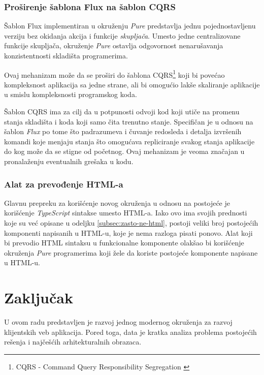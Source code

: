 \documentclass[12pt,oneside]{memoir}
\begin{document}
\subsection{Proširenje šablona Flux na šablon CQRS}
Šablon Flux implementiran u okruženju \emph{Pure} predstavlja jednu
pojednostavljenu verziju bez okidanja akcija i funkcije
\emph{skupljača}. Umesto jedne centralizovane funkcije skupljača,
okruženje \emph{Pure} ostavlja odgovornost nenarušavanja
konzistentnosti skladišta programerima.

Ovaj mehanizam može da se proširi do šablona CQRS\footnote{CQRS - Command Query Responsibility Segregation \cite{CQRS}} \cite{CQRS} koji bi povećao
kompleksnost aplikacija sa jedne strane, ali bi omogućio lakše
skaliranje aplikacije u smislu kompleksnosti programskog koda.

Šablon CQRS ima za cilj da u potpunosti odvoji kod koji utiče na
promenu stanja skladišta i koda koji samo čita trenutno stanje.
Specifičan je u odnosu na šablon \emph{Flux} po tome što padrazumeva i čuvanje redosleda i detalja izvršenih komandi koje menjaju stanja što omogućava repliciranje svakog stanja aplikacije
do kog može da se stigne od početnog. Ovaj mehanizam je veoma značajan u pronalaženju eventualnih grešaka u kodu.
\subsection{Alat za prevođenje HTML-a}
Glavnu prepreku za korišćenje novog okruženja u odnosu na postojeće je korišćenje \emph{TypeScript} sintakse umesto HTML-a. Iako ovo ima svojih prednosti koje su već opisane u odeljku \ref{subsec:zasto-ne-html}, postoji veliki broj postojećih komponenti
napisanih u HTML-u, koje je nema razloga pisati ponovo.
Alat koji bi prevodio HTML sintaksu u funkcionalne komponente olakšao bi korišćenje okruženja \emph{Pure} programerima koji žele da koriste postojeće komponente napisane u HTML-u.


\chapter{Zaključak}\label{chap:zakljucak}

U ovom radu predstavljen je razvoj jednog modernog okruženja za razvoj klijentskih veb aplikacija. Pored toga, data je kratka analiza problema postojećih rešenja i najčešćih arhitekturalnih obrazaca.
\end{document}
